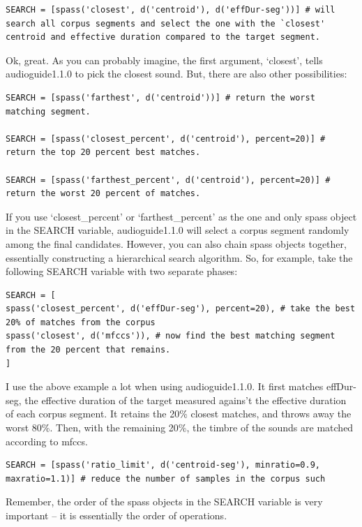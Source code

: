 \documentclass{article}
\newcommand{\ag}{audioguide1.1.0\xspace}
\begin{document}
\begin{spacing}{1.2}
\begin{lstlisting}
SEARCH = [spass('closest', d('centroid'), d('effDur-seg'))] # will search all corpus segments and select the one with the `closest' centroid and effective duration compared to the target segment.
\end{lstlisting}

Ok, great.  As you can probably imagine, the first argument, `closest', tells \ag to pick the closest sound.  But, there are also other possibilities:

\begin{lstlisting}
SEARCH = [spass('farthest', d('centroid'))] # return the worst matching segment.

SEARCH = [spass('closest_percent', d('centroid'), percent=20)] # return the top 20 percent best matches.

SEARCH = [spass('farthest_percent', d('centroid'), percent=20)] # return the worst 20 percent of matches.
\end{lstlisting}

If you use `closest\_percent' or `farthest\_percent' as the one and only spass object in the SEARCH variable, \ag will select a corpus segment randomly among the final candidates.  However, you can also chain spass objects together, essentially constructing a hierarchical search algorithm.  So, for example, take the following SEARCH variable with two separate phases:

\begin{lstlisting}
SEARCH = [
spass('closest_percent', d('effDur-seg'), percent=20), # take the best 20% of matches from the corpus
spass('closest', d('mfccs')), # now find the best matching segment from the 20 percent that remains.
] 
\end{lstlisting}

I use the above example a lot when using \ag.  It first matches effDur-seg, the effective duration of the target measured agains't the effective duration of each corpus segment.  It retains the 20\% closest matches, and throws away the worst 80\%.  Then, with the remaining 20\%, the timbre of the sounds are matched according to mfccs.

\begin{lstlisting}
SEARCH = [spass('ratio_limit', d('centroid-seg'), minratio=0.9, maxratio=1.1)] # reduce the number of samples in the corpus such 
\end{lstlisting}

Remember, the order of the spass objects in the SEARCH variable is very important -- it is essentially the order of operations.


\end{spacing}
\end{document}
